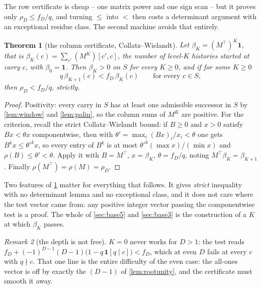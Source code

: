 \documentclass[11pt]{amsart}
\newtheorem{theorem}{Theorem}[section]
\theoremstyle{definition}
\theoremstyle{remark}
\newtheorem{remark}[theorem]{Remark}
\begin{document}
The row certificate is cheap -- one matrix power and one sign scan -- but it proves only $\rho_D \le f_D/q$, and turning $\le$ into $<$ then costs a determinant argument with an exceptional residue class. The second machine avoids that entirely.

\begin{theorem}[the column certificate, Collatz--Wielandt]
\label{thm:column}
Let $\beta_K = (M^{\top})^K\mathbf 1$, that is $\beta_K(c) = \sum_{c'}(M^K)[c',c]$, the number of level-$K$ histories \emph{started} at carry $c$, with $\beta_0 = \mathbf 1$. Then $\beta_K > 0$ on $S$ for every $K \ge 0$, and if for some $K \ge 0$
\[
  q\,\beta_{K+1}(c) < f_D\,\beta_K(c) \qquad\text{for every } c \in S,
\]
then $\rho_D < f_D/q$, strictly.
\end{theorem}

\begin{proof}
Positivity: every carry in $S$ has at least one admissible successor in $S$ by \cref{lem:window} and \cref{lem:palin}, so the column sums of $M^K$ are positive. For the criterion, recall the strict Collatz--Wielandt bound: if $B \ge 0$ and $x > 0$ satisfy $Bx < \theta x$ componentwise, then with $\theta' = \max_i (Bx)_i/x_i < \theta$ one gets $B^kx \le \theta'^kx$, so every entry of $B^k$ is at most $\theta'^k(\max x)/(\min x)$ and $\rho(B) \le \theta' < \theta$. Apply it with $B = M^{\top}$, $x = \beta_K$, $\theta = f_D/q$, noting $M^{\top}\beta_K = \beta_{K+1}$. Finally $\rho(M^{\top}) = \rho(M) = \rho_D$.
\end{proof}

Two features of \cref{thm:column} matter for everything that follows. It gives \emph{strict} inequality with no determinant lemma and no exceptional class, and it does not care where the test vector came from: any positive integer vector passing the componentwise test is a proof. The whole of \cref{sec:base5} and \cref{sec:base3} is the construction of a $K$ at which $\beta_K$ passes.

\begin{remark}[the depth is not free]
\label{rem:depthzero}
$K = 0$ never works for $D > 1$: the test reads $f_D + (-1)^{D-1}(D-1)\bigl(1 - q\,\mathbf 1[q\mid c]\bigr) < f_D$, which at even $D$ fails at every $c$ with $q \nmid c$. That one line is the entire difficulty of the even case: the all-ones vector is off by exactly the $(D-1)$ of \cref{lem:rootunity}, and the certificate must smooth it away.
\end{remark}

\end{document}
